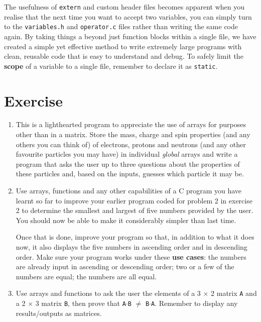 \documentclass[11pt,oneside]{article}
\newcounter{exercise}
\begin{document}
{{{{{{{{{{{{The usefulness of \verb+extern+ and custom header files becomes apparent when you realise that the next time you want to accept two variables, you can simply turn to the \verb+variables.h+ and \verb+operator.c+ files rather than writing the same code again. By taking things a beyond just function blocks within a single file, we have created a simple yet effective method to write extremely large programs with clean, reusable code that is easy to understand and debug. To safely limit the \textbf{scope} of a variable to a single file, remember to declare it as \verb+static+.

\section*{Exercise \theexercise}\label{ex:if}
\begin{enumerate}[label=\arabic*.]
\item \label{prog:elementary-particles}This is a lighthearted program to appreciate the use of arrays for purposes other than in a matrix. Store the mass, charge and spin properties (and any others you can think of) of electrons, protons and neutrons (and any other favourite particles you may have) in individual \textit{global} arrays and write a program that asks the user up to three questions about the properties of these particles and, based on the inputs, guesses which particle it may be.

\item Use arrays, functions and any other capabilities of a C program you have learnt so far to improve your earlier program coded for problem 2 in exercise 2 to determine the smallest and largest of five numbers provided by the user. You should now be able to make it considerably simpler than last time.

Once that is done, improve your program so that, in addition to what it does now, it also displays the five numbers in ascending order and in descending order. Make sure your program works under these \textbf{use cases}: the numbers are already input in ascending or descending order; two or a few of the numbers are equal; the numbers are all equal.

\item Use arrays and functions to ask the user the elements of a 3 $\times$ 2 matrix \verb+A+ and a 2 $\times$ 3 matrix \verb+B+, then prove that \verb+A+$\cdot$\verb+B+ $\neq$ \verb+B+$\cdot$\verb+A+. Remember to display any results/outputs as matrices.


\end{enumerate}}}}}}}}}}}}}
\end{document}
